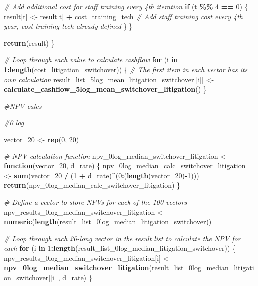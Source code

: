 \documentclass[
]{article}
\newenvironment{Shaded}{\begin{snugshade}}{\end{snugshade}}
\newcommand{\CommentTok}[1]{\textcolor[rgb]{0.56,0.35,0.01}{\textit{#1}}}
\newcommand{\ControlFlowTok}[1]{\textcolor[rgb]{0.13,0.29,0.53}{\textbf{#1}}}
\newcommand{\DecValTok}[1]{\textcolor[rgb]{0.00,0.00,0.81}{#1}}
\newcommand{\FunctionTok}[1]{\textcolor[rgb]{0.13,0.29,0.53}{\textbf{#1}}}
\newcommand{\NormalTok}[1]{#1}
\newcommand{\OtherTok}[1]{\textcolor[rgb]{0.56,0.35,0.01}{#1}}
\newcommand{\SpecialCharTok}[1]{\textcolor[rgb]{0.81,0.36,0.00}{\textbf{#1}}}
\begin{document}
\begin{Shaded}
\begin{Highlighting}[]
    \CommentTok{\# Add additional cost for staff training every 4th iteration}
    \ControlFlowTok{if}\NormalTok{ (t }\SpecialCharTok{\%\%} \DecValTok{4} \SpecialCharTok{==} \DecValTok{0}\NormalTok{) \{}
\NormalTok{      result[t] }\OtherTok{\textless{}{-}}\NormalTok{ result[t] }\SpecialCharTok{+}\NormalTok{ cost\_training\_tech  }\CommentTok{\# Add staff training cost every 4th year, cost training tech already defined}
\NormalTok{    \}}
\NormalTok{  \}}
  
  \FunctionTok{return}\NormalTok{(result)}
\NormalTok{\}}

\CommentTok{\# Loop through each value to calculate cashflow}
\ControlFlowTok{for}\NormalTok{ (i }\ControlFlowTok{in} \DecValTok{1}\SpecialCharTok{:}\FunctionTok{length}\NormalTok{(cost\_litigation\_switchover)) \{}
  \CommentTok{\# The first item in each vector has its own calculation}
\NormalTok{  result\_list\_5log\_mean\_litigation\_switchover[[i]] }\OtherTok{\textless{}{-}} \FunctionTok{calculate\_cashflow\_5log\_mean\_switchover\_litigation}\NormalTok{()}
\NormalTok{\}}



\CommentTok{\#NPV calcs}

\CommentTok{\#0 log }

\NormalTok{vector\_20 }\OtherTok{\textless{}{-}} \FunctionTok{rep}\NormalTok{(}\DecValTok{0}\NormalTok{, }\DecValTok{20}\NormalTok{)}

\CommentTok{\# NPV calculation function}
\NormalTok{npv\_0log\_median\_switchover\_litigation }\OtherTok{\textless{}{-}} \ControlFlowTok{function}\NormalTok{(vector\_20, d\_rate) \{}
\NormalTok{  npv\_0log\_median\_calc\_switchover\_litigation }\OtherTok{\textless{}{-}} \FunctionTok{sum}\NormalTok{(vector\_20 }\SpecialCharTok{/}\NormalTok{ (}\DecValTok{1} \SpecialCharTok{+}\NormalTok{ d\_rate)}\SpecialCharTok{\^{}}\NormalTok{(}\DecValTok{0}\SpecialCharTok{:}\NormalTok{(}\FunctionTok{length}\NormalTok{(vector\_20)}\SpecialCharTok{{-}}\DecValTok{1}\NormalTok{)))}
  \FunctionTok{return}\NormalTok{(npv\_0log\_median\_calc\_switchover\_litigation)}
\NormalTok{\}}

\CommentTok{\# Define a vector to store NPVs for each of the 100 vectors}
\NormalTok{npv\_results\_0log\_median\_switchover\_litigation }\OtherTok{\textless{}{-}} \FunctionTok{numeric}\NormalTok{(}\FunctionTok{length}\NormalTok{(result\_list\_0log\_median\_litigation\_switchover))}

\CommentTok{\# Loop through each 20{-}long vector in the result list to calculate the NPV for each}
\ControlFlowTok{for}\NormalTok{ (i }\ControlFlowTok{in} \DecValTok{1}\SpecialCharTok{:}\FunctionTok{length}\NormalTok{(result\_list\_0log\_median\_litigation\_switchover)) \{}
\NormalTok{  npv\_results\_0log\_median\_switchover\_litigation[i] }\OtherTok{\textless{}{-}} \FunctionTok{npv\_0log\_median\_switchover\_litigation}\NormalTok{(result\_list\_0log\_median\_litigation\_switchover[[i]], d\_rate)}
\NormalTok{\}}





\end{Highlighting}
\end{Shaded}
\end{document}
